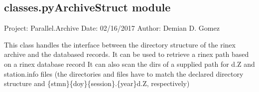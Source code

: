 \documentclass[letterpaper,10pt,english]{sphinxmanual}
\begin{document}
\subsection{classes.pyArchiveStruct module}
\label{\detokenize{classes:module-classes.pyArchiveStruct}}\label{\detokenize{classes:classes-pyarchivestruct-module}}
\sphinxAtStartPar
Project: Parallel.Archive
Date: 02/16/2017
Author: Demian D. Gomez

\sphinxAtStartPar
This class handles the interface between the directory structure of the rinex archive and the databased records.
It can be used to retrieve a rinex path based on a rinex database record
It can also scan the dirs of a supplied path for d.Z and station.info files (the directories and files have to match the
declared directory structure and \{stmn\}\{doy\}\{session\}.\{year\}d.Z, respectively)
\end{document}
